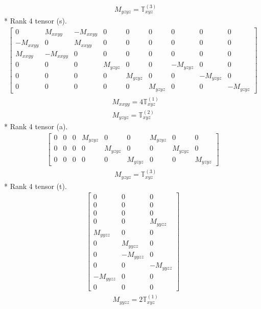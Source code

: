 \documentclass[fleqn,8pt,landscape]{jsarticle}
\begin{document}
\begin{align*}
& M_{yzyz} = \mathbb{T}_{xyz}^{(3)}
\end{align*}
* Rank 4 tensor (s).
\begin{align*}
\begin{bmatrix} 0 & M_{xxyy} & - M_{xxyy} & 0 & 0 & 0 & 0 & 0 & 0 \\ - M_{xxyy} & 0 & M_{xxyy} & 0 & 0 & 0 & 0 & 0 & 0 \\ M_{xxyy} & - M_{xxyy} & 0 & 0 & 0 & 0 & 0 & 0 & 0 \\ 0 & 0 & 0 & M_{yzyz} & 0 & 0 & - M_{yzyz} & 0 & 0 \\ 0 & 0 & 0 & 0 & M_{yzyz} & 0 & 0 & - M_{yzyz} & 0 \\ 0 & 0 & 0 & 0 & 0 & M_{yzyz} & 0 & 0 & - M_{yzyz} \end{bmatrix}
\end{align*}
\begin{align*}
& M_{xxyy} = 4 \mathbb{T}_{xyz}^{(1)} \\
& M_{yzyz} = \mathbb{T}_{xyz}^{(2)}
\end{align*}
* Rank 4 tensor (a).
\begin{align*}
\begin{bmatrix} 0 & 0 & 0 & M_{yzyz} & 0 & 0 & M_{yzyz} & 0 & 0 \\ 0 & 0 & 0 & 0 & M_{yzyz} & 0 & 0 & M_{yzyz} & 0 \\ 0 & 0 & 0 & 0 & 0 & M_{yzyz} & 0 & 0 & M_{yzyz} \end{bmatrix}
\end{align*}
\begin{align*}
& M_{yzyz} = \mathbb{T}_{xyz}^{(3)}
\end{align*}
* Rank 4 tensor (t).
\begin{align*}
\begin{bmatrix} 0 & 0 & 0 \\ 0 & 0 & 0 \\ 0 & 0 & 0 \\ 0 & 0 & M_{yyzz} \\ M_{yyzz} & 0 & 0 \\ 0 & M_{yyzz} & 0 \\ 0 & - M_{yyzz} & 0 \\ 0 & 0 & - M_{yyzz} \\ - M_{yyzz} & 0 & 0 \\ 0 & 0 & 0 \end{bmatrix}
\end{align*}
\begin{align*}
& M_{yyzz} = 2 \mathbb{T}_{xyz}^{(1)}
\end{align*}
\end{document}
